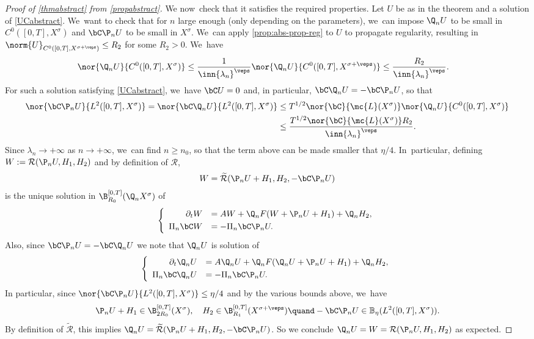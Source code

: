 \begin{proof}[Proof of \cref{thmabstract} from \cref{propabstract}]
We now~check that it satisfies the required properties. Let $U$ be as in the theorem and a solution of \eqref{UCabstract}. We~want to check that for $n$ large enough (only depending on the parameters), we~can impose $\Q_n U$ to be small in $C^{0}([0,T],X^{\sigma})$ and $\bC \P_n U$ to be small in $X^{\sigma}$. We~can apply \cref{prop:abs-prop-reg} to $U$ to propagate regularity, resulting in $\norm{U}_{C^0([0, T], X^{\sigma+\veps})}\leq R_{2}$ for some $R_{2}>0$. We~have
\begin{align}
\label{unifboundU}
\nor{ \Q_n U}{C^{0}([0,T],X^{\sigma})} &\leq \frac{1}{\inn{\lambda_n}^{\veps}} \nor{ \Q_n U}{C^{0}([0,T],X^{\sigma+\veps})}\leq \frac{R_{2}}{\inn{\lambda_n}^{\veps}} .
\end{align}
For such a solution satisfying \eqref{UCabstract}, we~have $\bC U=0$ and, in particular, $\bC \Q_n U=-\bC \P_n U$, so that
\begin{align*}
\nor{\bC \P_n U}{L^{2}([0,T],X^{\sigma})}=\nor{\bC \Q_n U}{L^{2}([0,T],X^{\sigma})}&\leq T^{1/2}\nor{\bC}{\mc{L}(X^\sigma)}\nor{ \Q_n U}{C^{0}([0,T],X^{\sigma})}\\
&\leq \frac{T^{1/2}\nor{\bC}{\mc{L}(X^\sigma)}R_{2}}{\inn{\lambda_n}^{\veps}} .
\end{align*}
Since $\lambda_n\to +\infty$ as $n\to +\infty$, we~can find $n\geq n_0$, so that the term above can be made smaller that $\eta/4$. In~particular, defining $W:= \mathcal{R}(\P_{n}U,H_{1},H_{2})$ and by definition of $\mathcal{R}$,
\begin{align*}
W= \mathcal{\widetilde{R}}(\P_{n}U+H_{1},H_{2},- \bC \P_{n}U)
\end{align*}
is the unique solution in $\B_{R_{0}}^{[0,T]}(\Q_n X^{\sigma})$ of
\begin{align*}
\left\{\begin{array}{rl}
\partial_t W&=AW+\Q_n F(W+\P_{n}U+H_{1})+\Q_{n}H_{2}, \\[3pt]
\Pi_n\bC W &=-\Pi_n \bC \P_{n}U.
\end{array}\right.
\end{align*}
Also, since $\bC \P_{n}U=- \bC \Q_{n}U $ we note that $\Q_n U$ is solution of
\begin{align*}
\left\{\begin{array}{rl}
\partial_t \Q_n U&=A\Q_n U+\Q_n F(\Q_n U+\P_n U+H_{1})+\Q_{n}H_{2}, \\[3pt]
\Pi_n\bC \Q_n U &=-\Pi_n \bC \P_{n}U.
\end{array}\right.
\end{align*}
In particular, since $ \nor{\bC \P_n U}{L^{2}([0,T],X^{\sigma})}\leq \eta/4$ and by the various bounds above, we~have
\[
\P_n U+H_{1}\in \B_{2R_{0}}^{[0,T]}(X^{\sigma}),\quad H_{2}\in \B_{R_{1}}^{[0,T]}(X^{\sigma+\veps})\quand-\bC \P_{n}U\in \mathbb{B}_{\eta}(L^2([0, T], X^{\sigma})).
\]
By definition of $\mathcal{\widetilde{R}}$, this implies $\Q_n U= \mathcal{\widetilde{R}}(\P_n U+H_{1},H_{2},- \bC \P_{n}U)$. So we conclude $\Q_{n}U=W=\mathcal{R}(\P_{n}U,H_{1},H_{2})$ as expected.


\end{proof}
